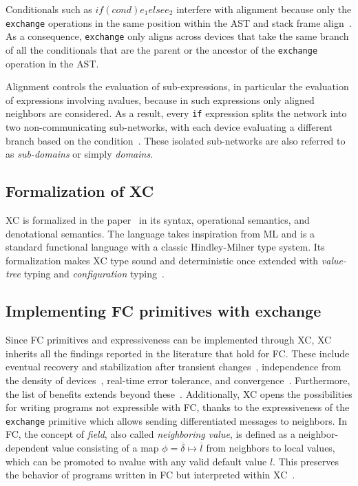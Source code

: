 Conditionals such as $if (cond) {e_1} else {e_2}$ interfere with alignment because only the \texttt{exchange} operations in the same position within the \ac{AST} and stack frame align~\cite{xc}.
%
As a consequence, \texttt{exchange} only aligns across devices that take the same branch of all the conditionals that are the parent or the ancestor of the \texttt{exchange} operation in the \ac{AST}.

Alignment controls the evaluation of sub-expressions, in particular the evaluation of expressions involving nvalues, because in such expressions only aligned neighbors are considered.
%
As a result, every \texttt{if} expression splits the network into two non-communicating sub-networks, with each device evaluating a different branch based on the condition~\cite{xc}.
%
These isolated sub-networks are also referred to as \textit{sub-domains} or simply \textit{domains}.

\subsection{Formalization of XC}

\ac{XC} is formalized in the paper~\cite{xc} in its syntax, operational semantics, and denotational semantics.
%
The language takes inspiration from \ac{ML} and is a standard functional language with a classic Hindley-Milner type system.
%
Its formalization makes \ac{XC} type sound and deterministic once extended with \textit{value-tree} typing and \textit{configuration} typing~\cite{xc}.

\subsection{Implementing FC primitives with exchange}

Since \ac{FC} primitives and expressiveness can be implemented through \ac{XC}, \ac{XC} inherits all the findings reported in the literature that hold for \ac{FC}.
%
These include eventual recovery and stabilization after transient changes~\cite{self-stabilisation-in-fc}, independence from the density of devices~\cite{density-independence-in-fc}, real-time error tolerance, and convergence~\cite{real-time-error-tolerance-in-fc}.
%
Furthermore, the list of benefits extends beyond these~\cite{xc}.
%
Additionally, \ac{XC} opens the possibilities for writing programs not expressible with \ac{FC}, thanks to the expressiveness of the \texttt{exchange} primitive which allows sending differentiated messages to neighbors.
%
In \ac{FC}, the concept of \textit{field}, also called \textit{neighboring value}, is defined as a neighbor-dependent value consisting of a map $\phi = \overline{\delta} \mapsto \overline{l}$ from neighbors to local values, which can be promoted to nvalue with any valid default value $l$.
%
This preserves the behavior of programs written in \ac{FC} but interpreted within \ac{XC}~\cite{xc}.

